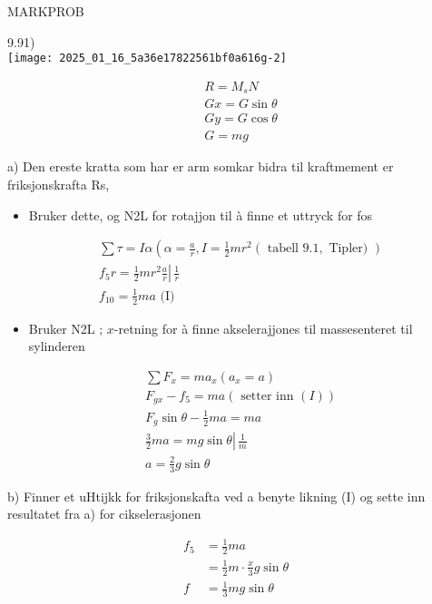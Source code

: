 \documentclass[10pt]{article}
\begin{document}
MARKPROB

9.91)\\
\texttt{[image: 2025\_01\_16\_5a36e17822561bf0a616g-2]}

$$
\begin{aligned}
& R=M_{s} N \\
& G x=G \sin \theta \\
& G y=G \cos \theta \\
& G=m g
\end{aligned}
$$

a) Den ereste kratta som har er arm somkar bidra til kraftmement er friksjonskrafta Rs,

\begin{itemize}
  \item Bruker dette, og N2L for rotajjon til à finne et uttryck for fos
\end{itemize}


\begin{align*}
& \sum \tau=I \alpha\left(\alpha=\frac{a}{r}, I=\frac{1}{2} m r^{2}(\text { tabell } 9.1, \text { Tipler) })\right. \\
& \left.f_{5} r=\frac{1}{2} m r^{2} \frac{a}{r} \right\rvert\, \frac{1}{r} \\
& f_{10}=\frac{1}{2} m a \text { (I) } \tag{I}
\end{align*}


\begin{itemize}
  \item Bruker N2L ; $x$-retning for à finne akselerajjones til massesenteret til sylinderen
\end{itemize}

$$
\begin{aligned}
& \sum F_{x}=m a_{x}\left(a_{x}=a\right) \\
& F_{g x}-f_{5}=m a(\text { setter inn }(I)) \\
& F_{g} \sin \theta-\frac{1}{2} m a=m a \\
& \left.\frac{3}{2} m a=m g \sin \theta \right\rvert\, \frac{1}{m} \\
& a=\frac{2}{3} g \sin \theta
\end{aligned}
$$

b) Finner et uHtijkk for friksjonskafta ved a benyte likning (I) og sette inn resultatet fra a) for cikselerasjonen

$$
\begin{aligned}
f_{5} & =\frac{1}{2} m a \\
& =\frac{1}{2} m \cdot \frac{x}{3} g \sin \theta \\
f & =\frac{1}{3} m g \sin \theta
\end{aligned}
$$
\end{document}
